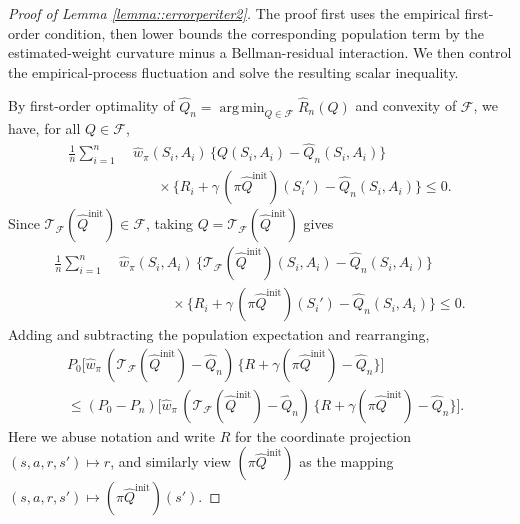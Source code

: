 \documentclass{article}
\DeclareMathOperator*{\argmin}{arg\,min}
\theoremstyle{plain}
\theoremstyle{definition}
\theoremstyle{remark}
\begin{document}
\begin{proof}[Proof of Lemma \ref{lemma::errorperiter2}]
The proof first uses the empirical first-order condition, then lower bounds the
corresponding population term by the estimated-weight curvature minus a
Bellman-residual interaction. We then control the empirical-process fluctuation
and solve the resulting scalar inequality.

By first-order optimality of
\(\hat{Q}_n = \argmin_{Q \in \mathcal{F}} \hat R_n(Q)\) and convexity of
\(\mathcal{F}\), we have, for all \(Q \in \mathcal{F}\),
\begin{align*}
\frac{1}{n}\sum_{i=1}^n
&\;\hat{w}_{\pi}(S_i,A_i)\,
\bigl\{Q(S_i,A_i)-\hat{Q}_n(S_i,A_i)\bigr\}
\\
&\qquad\times
\bigl\{R_i + \gamma\,(\pi \hat{Q}^{\mathrm{init}})(S_i') - \hat{Q}_n(S_i,A_i)\bigr\}
\le 0.
\end{align*}
Since
\(\mathcal{T}_{\mathcal{F}}(\hat{Q}^{\mathrm{init}}) \in \mathcal{F}\),
taking \(Q = \mathcal{T}_{\mathcal{F}}(\hat{Q}^{\mathrm{init}})\) gives
\begin{align*}
\frac{1}{n}\sum_{i=1}^n
&\;\hat{w}_{\pi}(S_i,A_i)\,
\bigl\{\mathcal{T}_{\mathcal{F}}(\hat{Q}^{\mathrm{init}})(S_i,A_i)
- \hat{Q}_n(S_i,A_i)\bigr\}
\\[-0.25em]
&\qquad\qquad\times
\bigl\{R_i + \gamma\,(\pi \hat{Q}^{\mathrm{init}})(S_i') - \hat{Q}_n(S_i,A_i)\bigr\}
\le 0.
\end{align*}
Adding and subtracting the population expectation and rearranging,
\begin{equation}
\label{eqn::firstbasic}
\begin{aligned}
&P_0\big[
   \hat{w}_{\pi}\,
   (\mathcal{T}_{\mathcal{F}}(\hat{Q}^{\mathrm{init}}) - \hat{Q}_n)\,
   \{R + \gamma(\pi \hat{Q}^{\mathrm{init}}) - \hat{Q}_n\}
\big]
\\
&\le
(P_0 - P_n)\big[
   \hat{w}_{\pi}\,
   (\mathcal{T}_{\mathcal{F}}(\hat{Q}^{\mathrm{init}}) - \hat{Q}_n)\,
   \{R + \gamma(\pi \hat{Q}^{\mathrm{init}}) - \hat{Q}_n\}
\big].
\end{aligned}
\end{equation}
Here we abuse notation and write \(R\) for the coordinate projection
\((s,a,r,s') \mapsto r\), and similarly view \((\pi \hat{Q}^{\mathrm{init}})\)
as the mapping \((s,a,r,s') \mapsto (\pi \hat{Q}^{\mathrm{init}})(s')\).


\end{proof}
\end{document}
